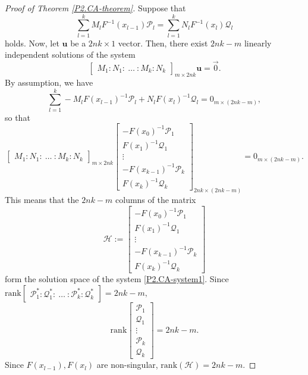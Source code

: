 \documentclass[10pt,reqno,oneside,a4paper]{article}
\begin{document}
\begin{proof}[Proof of Theorem \ref{P2.CA-theorem}]
Suppose that 
\[  \sum^k_{l=1} M_lF^{-1}(x_{l-1})\mathcal{P}_l = \sum^k_{l=1} N_l F^{-1}(x_l)\mathcal{Q}_l \]
holds. Now, let $\textbf{u}$ be a $2nk\times 1$ vector. Then, there exist $2nk-m$ linearly independent solutions of the system 
\[ 
\begin{bmatrix}
M_1 : N_1 :~ \ldots ~: M_k : N_k
\end{bmatrix}_{m\times 2nk}
\textbf{u}= \vec{0}.
\]
By assumption, we have 
\[
\sum^{k}_{l=1} -M_l  F(x_{l-1})^{-1} \mathcal{P}_l+ N_l F(x_l)^{-1} \mathcal{Q}_l   =   0_{m \times (2nk-m)} ,
\]
so that 
\begin{equation}\label{P2.CA-system1}
\begin{bmatrix}
M_1 : N_1 :~ \ldots ~: M_k : N_k
\end{bmatrix}_{m\times 2nk}
\begin{bmatrix}
-F(x_{0})^{-1} \mathcal{P}_1 \\
F(x_1)^{-1} \mathcal{Q}_1 \\
\vdots \\
-F(x_{k-1})^{-1} \mathcal{P}_k \\
F(x_k)^{-1} \mathcal{Q}_k
\end{bmatrix}_{2nk \times(2nk-m)} = 0_{m \times(2nk-m)}. 
\end{equation}
This means that the $2nk-m$ columns of the matrix 
\[ \mathcal{H} := 
\begin{bmatrix}
-F(x_{0})^{-1} \mathcal{P}_1 \\
F(x_1)^{-1}\mathcal{Q}_1 \\
\vdots \\
-F(x_{k-1})^{-1} \mathcal{P}_k \\
F(x_k)^{-1}\mathcal{Q}_k 
\end{bmatrix}
\]
form the solution space of the system \eqref{P2.CA-system1}. Since $\mathrm{rank}\begin{bmatrix} \mathcal{P}^*_1 : \mathcal{Q}^*_1 :~ \ldots ~: \mathcal{P}^*_k : \mathcal{Q}^*_k \end{bmatrix} = 2nk-m,$
\[ 
\mathrm{rank}
\begin{bmatrix}
\mathcal{P}_1 \\
\mathcal{Q}_1\\
\vdots \\
\mathcal{P}_k \\
\mathcal{Q}_k
\end{bmatrix}
= 2nk-m.
\] 
Since $F(x_{l-1}), F(x_{l})$ are non-singular, $\mathrm{rank}(\mathcal{H}) = 2nk - m.$


\end{proof}
\end{document}
